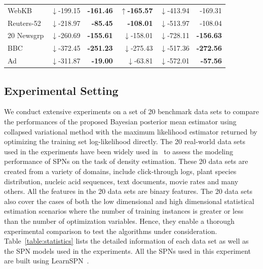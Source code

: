 \documentclass{article} %
\theoremstyle{definition}
\begin{document}
\begin{table}[htb]
\begin{tabular}{|l|r|r||r|r|r|}
WebKB & $\downarrow$-199.15 & \textbf{-161.46} & $\uparrow$\textbf{-165.57} & $\downarrow$-413.94 & -169.31 \\
Reuters-52 & $\downarrow$-218.97 & \textbf{-85.45} & \textbf{-108.01} & $\downarrow$-513.97 & -108.04 \\
20 Newsgrp & $\downarrow$-260.69 & \textbf{-155.61} & $\downarrow$-158.01 & $\downarrow$-728.11 & \textbf{-156.63}\\
BBC & $\downarrow$-372.45 & \textbf{-251.23} & $\downarrow$-275.43  & $\downarrow$-517.36 &  \textbf{-272.56}\\
Ad & $\downarrow$-311.87 & \textbf{-19.00} & $\downarrow$-63.81 & $\downarrow$-572.01 & \textbf{-57.56}\\\hline
\end{tabular}
\end{table}

\subsection{Experimental Setting}
We conduct extensive experiments on a set of 20 benchmark data sets to compare the performances of the proposed Bayesian posterior mean estimator using collapsed variational method with the maximum likelihood estimator returned by optimizing the training set log-likelihood directly. The 20 real-world data sets used in the experiments have been widely used in~\cite{gens2013learning,rooshenas2014learning} to assess the modeling performance of SPNs on the task of density estimation. These 20 data sets are created from a variety of domains, include click-through logs, plant species distribution, nucleic acid sequences, text documents, movie rates and many others. All the features in the 20 data sets are binary features. The 20 data sets also cover the cases of both the low dimensional and high dimensional statistical estimation scenarios where the number of training instances is greater or less than the number of optimization variables. Hence, they enable a thorough experimental comparison to test the algorithms under consideration. Table~\ref{table:statistics} lists the detailed information of each data set as well as the SPN models used in the experiments. All the SPNs used in this experiment are built using LearnSPN~\cite{gens2013learning}. 
\end{document}
